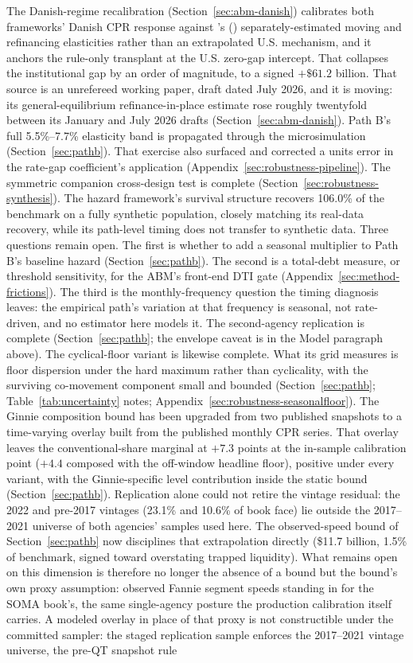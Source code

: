\documentclass[12pt]{article}
\newcommand{\citepos}[1]{\citeauthor{#1}'s (\citeyear{#1})}
\begin{document}
The Danish-regime recalibration (Section~\ref{sec:abm-danish}) calibrates both frameworks' Danish CPR response against \citepos{berger2026} separately-estimated moving and refinancing elasticities rather than an extrapolated U.S. mechanism, and it anchors the rule-only transplant at the U.S. zero-gap intercept. That collapses the institutional gap by an order of magnitude, to a signed $+\$61.2$ billion. That source is an unrefereed working paper, draft dated July 2026, and it is moving: its general-equilibrium refinance-in-place estimate rose roughly twentyfold between its January and July 2026 drafts (Section~\ref{sec:abm-danish}). Path B's full 5.5\%--7.7\% elasticity band is propagated through the microsimulation (Section~\ref{sec:pathb}). That exercise also surfaced and corrected a units error in the rate-gap coefficient's application (Appendix~\ref{sec:robustness-pipeline}). The symmetric companion cross-design test is complete (Section~\ref{sec:robustness-synthesis}). The hazard framework's survival structure recovers 106.0\% of the benchmark on a fully synthetic population, closely matching its real-data recovery, while its path-level timing does not transfer to synthetic data. Three questions remain open. The first is whether to add a seasonal multiplier to Path B's baseline hazard (Section~\ref{sec:pathb}). The second is a total-debt measure, or threshold sensitivity, for the ABM's front-end DTI gate (Appendix~\ref{sec:method-frictions}). The third is the monthly-frequency question the timing diagnosis leaves: the empirical path's variation at that frequency is seasonal, not rate-driven, and no estimator here models it. The second-agency replication is complete (Section~\ref{sec:pathb}; the envelope caveat is in the Model paragraph above). The cyclical-floor variant is likewise complete. What its grid measures is floor dispersion under the hard maximum rather than cyclicality, with the surviving co-movement component small and bounded (Section~\ref{sec:pathb}; Table~\ref{tab:uncertainty} notes; Appendix~\ref{sec:robustness-seasonalfloor}). The Ginnie composition bound has been upgraded from two published snapshots to a time-varying overlay built from the published monthly CPR series. That overlay leaves the conventional-share marginal at $+7.3$ points at the in-sample calibration point ($+4.4$ composed with the off-window headline floor), positive under every variant, with the Ginnie-specific level contribution inside the static bound (Section~\ref{sec:pathb}). Replication alone could not retire the vintage residual: the 2022 and pre-2017 vintages (23.1\% and 10.6\% of book face) lie outside the 2017--2021 universe of both agencies' samples used here. The observed-speed bound of Section~\ref{sec:pathb} now disciplines that extrapolation directly (\$11.7 billion, 1.5\% of benchmark, signed toward overstating trapped liquidity). What remains open on this dimension is therefore no longer the absence of a bound but the bound's own proxy assumption: observed Fannie segment speeds standing in for the SOMA book's, the same single-agency posture the production calibration itself carries. A modeled overlay in place of that proxy is not constructible under the committed sampler: the staged replication sample enforces the 2017--2021 vintage universe, the pre-QT snapshot rule 
\end{document}
